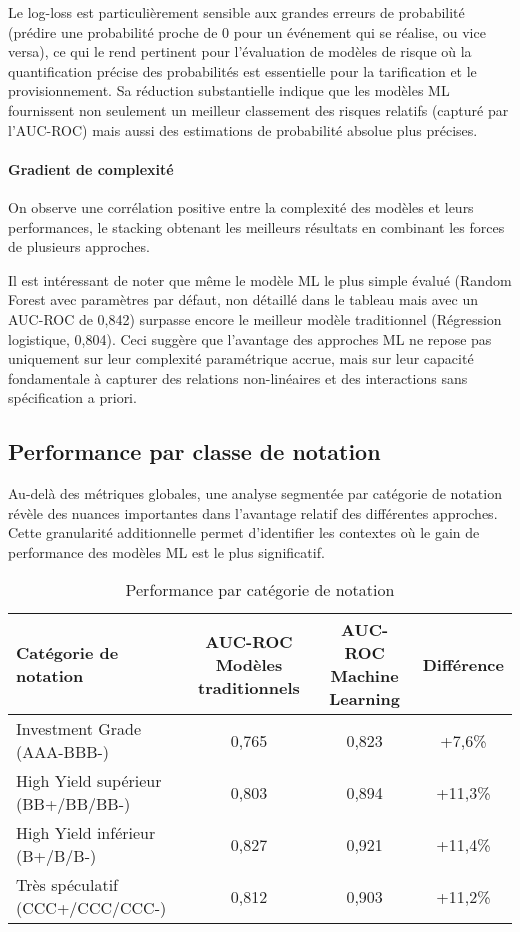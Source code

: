 Le log-loss est particulièrement sensible aux grandes erreurs de probabilité (prédire une probabilité proche de 0 pour un événement qui se réalise, ou vice versa), ce qui le rend pertinent pour l'évaluation de modèles de risque où la quantification précise des probabilités est essentielle pour la tarification et le provisionnement. Sa réduction substantielle indique que les modèles ML fournissent non seulement un meilleur classement des risques relatifs (capturé par l'AUC-ROC) mais aussi des estimations de probabilité absolue plus précises.

\paragraph{Gradient de complexité} On observe une corrélation positive entre la complexité des modèles et leurs performances, le stacking obtenant les meilleurs résultats en combinant les forces de plusieurs approches.

Il est intéressant de noter que même le modèle ML le plus simple évalué (Random Forest avec paramètres par défaut, non détaillé dans le tableau mais avec un AUC-ROC de 0,842) surpasse encore le meilleur modèle traditionnel (Régression logistique, 0,804). Ceci suggère que l'avantage des approches ML ne repose pas uniquement sur leur complexité paramétrique accrue, mais sur leur capacité fondamentale à capturer des relations non-linéaires et des interactions sans spécification a priori.

\subsection{Performance par classe de notation}

Au-delà des métriques globales, une analyse segmentée par catégorie de notation révèle des nuances importantes dans l'avantage relatif des différentes approches. Cette granularité additionnelle permet d'identifier les contextes où le gain de performance des modèles ML est le plus significatif.

\begin{table}[htbp]
  \centering
  \caption{Performance par catégorie de notation}
  \begin{tabular}{lccc}
    \toprule
    \textbf{Catégorie de notation} & \textbf{AUC-ROC Modèles traditionnels} & \textbf{AUC-ROC Machine Learning} & \textbf{Différence} \\
    \midrule
    Investment Grade (AAA-BBB-) & 0,765 & 0,823 & +7,6\% \\
    High Yield supérieur (BB+/BB/BB-) & 0,803 & 0,894 & +11,3\% \\
    High Yield inférieur (B+/B/B-) & 0,827 & 0,921 & +11,4\% \\
    Très spéculatif (CCC+/CCC/CCC-) & 0,812 & 0,903 & +11,2\% \\
    \bottomrule
  \end{tabular}
\end{table}

